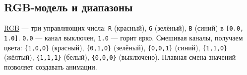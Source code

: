 \subsection{RGB-модель и диапазоны}
\hyperlink{term:rgb}{RGB} — три управляющих числа: \verb|R| (красный), \verb|G| (зелёный), \verb|B| (синий) в \verb|[0.0, 1.0]|. \verb|0.0| — канал выключен, \verb|1.0| — горит ярко. Смешивая каналы, получаем цвета: \verb|{1,0,0}| (красный), \verb|{0,1,0}| (зелёный), \verb|{0,0,1}| (синий), \verb|{1,1,0}| (жёлтый), \verb|{1,1,1}| (белый), \verb|{0,0,0}| (выключено). Плавная смена значений позволяет создавать анимации.
